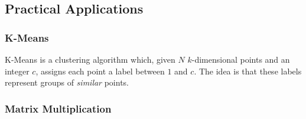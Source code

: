 \subsection{Practical Applications}
\label{subsec:storage_apps}
\subsubsection{K-Means}
\label{subsubsec:kmeans_redis}
K-Means \cite{Lloyd82leastsquares} is a clustering algorithm which, given $N$ $k$-dimensional points and an integer $c$, assigns each point a label between $1$ and $c$. The idea is that these labels represent groups of \textit{similar} points. 

\subsubsection{Matrix Multiplication}
\label{subsubsec:matmul_redis}
